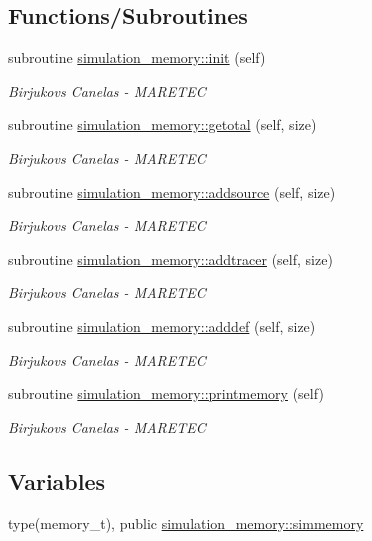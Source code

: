 \subsection*{Functions/\+Subroutines}
\begin{DoxyCompactItemize}
\item 
subroutine \mbox{\hyperlink{namespacesimulation__memory_a638f6d140103702b9e9cc46e2c060c61}{simulation\+\_\+memory\+::init}} (self)
\begin{DoxyCompactList}\small\item\em Birjukovs Canelas -\/ M\+A\+R\+E\+T\+EC \end{DoxyCompactList}\item 
subroutine \mbox{\hyperlink{namespacesimulation__memory_a8589522c4e28cf60741a5439477cdb31}{simulation\+\_\+memory\+::getotal}} (self, size)
\begin{DoxyCompactList}\small\item\em Birjukovs Canelas -\/ M\+A\+R\+E\+T\+EC \end{DoxyCompactList}\item 
subroutine \mbox{\hyperlink{namespacesimulation__memory_acf01ce7bcb2d7571d37fb2c0338e5bd2}{simulation\+\_\+memory\+::addsource}} (self, size)
\begin{DoxyCompactList}\small\item\em Birjukovs Canelas -\/ M\+A\+R\+E\+T\+EC \end{DoxyCompactList}\item 
subroutine \mbox{\hyperlink{namespacesimulation__memory_a4d6c8bd027a99cb6c7f9ad2eb55c744f}{simulation\+\_\+memory\+::addtracer}} (self, size)
\begin{DoxyCompactList}\small\item\em Birjukovs Canelas -\/ M\+A\+R\+E\+T\+EC \end{DoxyCompactList}\item 
subroutine \mbox{\hyperlink{namespacesimulation__memory_a62d5641dbec45bc279575c173b0f0f24}{simulation\+\_\+memory\+::adddef}} (self, size)
\begin{DoxyCompactList}\small\item\em Birjukovs Canelas -\/ M\+A\+R\+E\+T\+EC \end{DoxyCompactList}\item 
subroutine \mbox{\hyperlink{namespacesimulation__memory_a5827bef8479b809a453af147ceaa8c7c}{simulation\+\_\+memory\+::printmemory}} (self)
\begin{DoxyCompactList}\small\item\em Birjukovs Canelas -\/ M\+A\+R\+E\+T\+EC \end{DoxyCompactList}\end{DoxyCompactItemize}
\subsection*{Variables}
\begin{DoxyCompactItemize}
\item 
type(memory\+\_\+t), public \mbox{\hyperlink{namespacesimulation__memory_a8ed2bc20b0c49405084442d02fc76d42}{simulation\+\_\+memory\+::simmemory}}
\end{DoxyCompactItemize}
